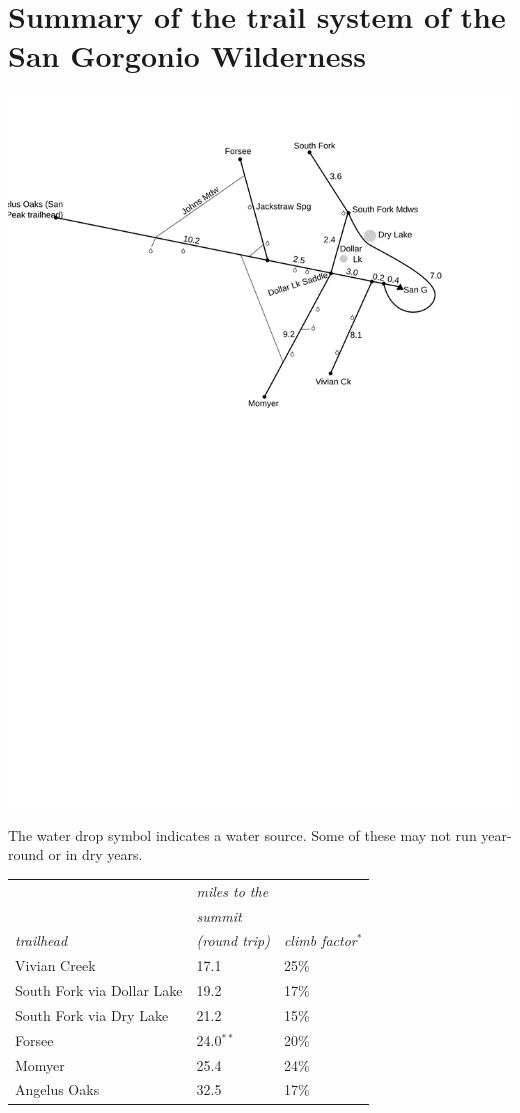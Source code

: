 \documentclass{san-g}
\begin{document}
\section{Summary of the trail system of the San Gorgonio Wilderness}

\vspace{10mm}

\includegraphics{figs/schematic}

The water drop symbol indicates a water source. Some of these may not run year-round or
in dry years.

\vspace{10mm}

\begin{tabular}{lp{30mm}l}
                 & \emph{miles to the}  \\
                 & \emph{summit}  \\
\emph{trailhead} & \emph{(round trip)} & \emph{climb factor${}^*$} \\
Vivian Creek                 &   17.1   &   25\% \\
South Fork via Dollar Lake   &   19.2   &   17\% \\
South Fork via Dry Lake      &   21.2   &   15\% \\
Forsee                       &   24.0${}^{**}$   &   20\% \\
Momyer                       &   25.4   &   24\% \\
Angelus Oaks                 &   32.5   &   17\% 
\end{tabular}
\end{document}
